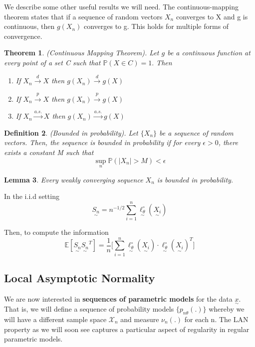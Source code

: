 \documentclass[twoside]{article}
\newcounter{lecnum}
\newtheorem{theorem}{Theorem}[lecnum]
\newtheorem{lemma}[theorem]{Lemma}
\newtheorem{definition}[theorem]{Definition}
\newcommand{\utilde}{\underset{\sim}}
\begin{document}
We describe some other useful results we will need. The continuous-mapping theorem states that if a sequence of random vectors $X_n$ converges to X and g is continuous, then $g(X_n)$ converges to g. This holds for multiple forms of convergence.

\begin{theorem}(Continuous Mapping Theorem). Let $g$ be a continuous function at every point of a set C such that $\mathbb{P}(X \in C) = 1.$ Then 
\begin{enumerate}
\item If $X_n \xrightarrow{d} X$ then $g(X_n) \xrightarrow{d} g(X)$
\item If $X_n \xrightarrow{p} X$ then $g(X_n) \xrightarrow{p} g(X)$
\item If $X_n \xrightarrow{a.s.} X$ then $g(X_n) \xrightarrow{a.s.} g(X)$
\end{enumerate}
\end{theorem}

\begin{definition}(Bounded in probability). Let $\{X_n\}$ be a sequence of random vectors. Then, the sequence is bounded in probability if for every $\epsilon > 0$, there exists a constant M such that 
$$
\sup_{n}\mathbb{P}(|X_n| > M) < \epsilon
$$
\end{definition}

\begin{lemma}Every weakly converging sequence $X_n$ is bounded in probability.
\end{lemma}


In the i.i.d setting 
$$
\utilde{S_n} = n^{-1/2}\sum_{i=1}^{n}\utilde{\ell_{\theta}^{\circ}}(\utilde{X_i})
$$

Then, to compute the information 
$$
\mathbb{E}[\utilde{S_n}\utilde{S_n}^T] = \frac{1}{n}\bigg[\sum_{i=1}^{n}\utilde{\ell_{\theta}^{\circ}}(\utilde{X_i}) \cdot \utilde{\ell_{\theta}^{\circ}}(\utilde{X_i})^T \bigg]
$$

\subsection{Local Asymptotic Normality}

We are now interested in \textbf{sequences of parametric models} for the data $\utilde{x}$. That is, we will define a sequence of probability models $\{p_{n\theta}(.)\}$ whereby we will have a different sample space $\mathcal{X}_n$ and measure $\nu_n(.)$ for each n. The LAN property as we will soon see captures a particular aspect of regularity in regular parametric models.
\end{document}
